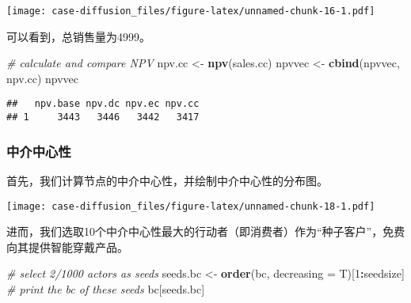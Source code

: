 \documentclass[]{article}
\newenvironment{Shaded}{\begin{snugshade}}{\end{snugshade}}
\newcommand{\CommentTok}[1]{\textcolor[rgb]{0.56,0.35,0.01}{\textit{#1}}}
\newcommand{\DataTypeTok}[1]{\textcolor[rgb]{0.13,0.29,0.53}{#1}}
\newcommand{\DecValTok}[1]{\textcolor[rgb]{0.00,0.00,0.81}{#1}}
\newcommand{\FloatTok}[1]{\textcolor[rgb]{0.00,0.00,0.81}{#1}}
\newcommand{\KeywordTok}[1]{\textcolor[rgb]{0.13,0.29,0.53}{\textbf{#1}}}
\newcommand{\NormalTok}[1]{#1}
\newcommand{\OperatorTok}[1]{\textcolor[rgb]{0.81,0.36,0.00}{\textbf{#1}}}
\newcommand{\StringTok}[1]{\textcolor[rgb]{0.31,0.60,0.02}{#1}}
\begin{document}
\texttt{[image: case-diffusion\_files/figure-latex/unnamed-chunk-16-1.pdf]}

可以看到，总销售量为4999。

\begin{Shaded}
\begin{Highlighting}[]
\CommentTok{# calculate and compare NPV}
\NormalTok{npv.cc <-}\StringTok{ }\KeywordTok{npv}\NormalTok{(sales.cc)}
\NormalTok{npvvec <-}\StringTok{ }\KeywordTok{cbind}\NormalTok{(npvvec, npv.cc)}
\NormalTok{npvvec}
\end{Highlighting}
\end{Shaded}

\begin{verbatim}
##   npv.base npv.dc npv.ec npv.cc
## 1     3443   3446   3442   3417
\end{verbatim}

\subsubsection{中介中心性}

首先，我们计算节点的中介中心性，并绘制中介中心性的分布图。

\begin{Shaded}
\end{Shaded}

\texttt{[image: case-diffusion\_files/figure-latex/unnamed-chunk-18-1.pdf]}

进而，我们选取10个中介中心性最大的行动者（即消费者）作为``种子客户''，免费向其提供智能穿戴产品。

\begin{Shaded}
\begin{Highlighting}[]
\CommentTok{# select 2/1000 actors as seeds}
\NormalTok{seeds.bc <-}\StringTok{ }\KeywordTok{order}\NormalTok{(bc, }\DataTypeTok{decreasing =}\NormalTok{ T)[}\DecValTok{1}\OperatorTok{:}\NormalTok{seedsize]}
\CommentTok{# print the bc of these seeds}
\NormalTok{bc[seeds.bc]}
\end{Highlighting}
\end{Shaded}
\end{document}
